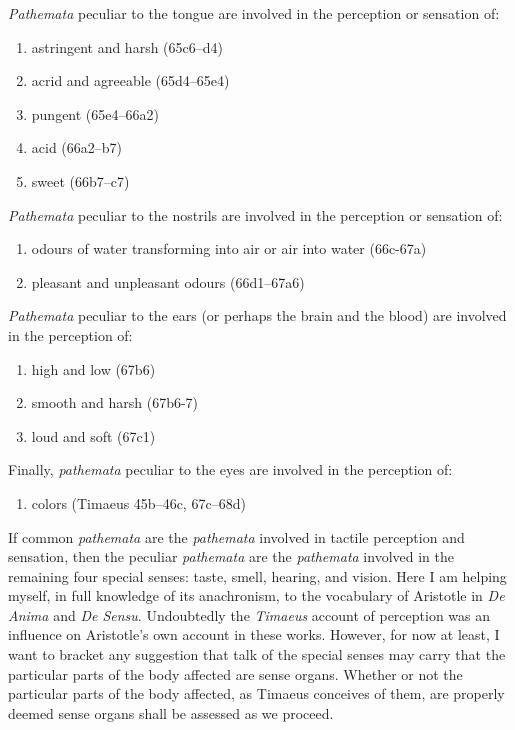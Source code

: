 \emph{Pathemata} peculiar to the tongue are involved in the perception or sensation of:
\begin{enumerate}
	\item astringent and harsh (65c6--d4)
	\item acrid and agreeable (65d4--65e4)
	\item pungent (65e4--66a2)
	\item acid (66a2--b7)
	\item sweet (66b7--c7)
\end{enumerate}
	

\emph{Pathemata} peculiar to the nostrils are involved in the perception or sensation of:
\begin{enumerate}
	\item odours of water transforming into air or air into water (66c-67a)
	\item pleasant and unpleasant odours (66d1--67a6)
\end{enumerate}
	
\emph{Pathemata} peculiar to the ears (or perhaps the brain and the blood) are involved in the perception of:
\begin{enumerate}
	\item high and low (67b6)
	\item smooth and harsh (67b6-7)
	\item loud and soft (67c1)
\end{enumerate}
	
Finally, \emph{pathemata} peculiar to the eyes are involved in the perception of:
\begin{enumerate}
	\item colors (Timaeus 45b--46c, 67c--68d)
\end{enumerate}
	
If common \emph{pathemata} are the \emph{pathemata} involved in tactile perception and sensation, then the peculiar \emph{pathemata} are the \emph{pathemata} involved in the remaining four special senses: taste, smell, hearing, and vision. Here I am helping myself, in full knowledge of its anachronism, to the vocabulary of Aristotle in \emph{De Anima} and \emph{De Sensu}. Undoubtedly the \emph{Timaeus} account of perception was an influence on Aristotle's own account in these works. However, for now at least, I want to bracket any suggestion that talk of the special senses may carry that the particular parts of the body affected are sense organs. Whether or not the particular parts of the body affected, as Timaeus conceives of them, are properly deemed sense organs shall be assessed as we proceed.

